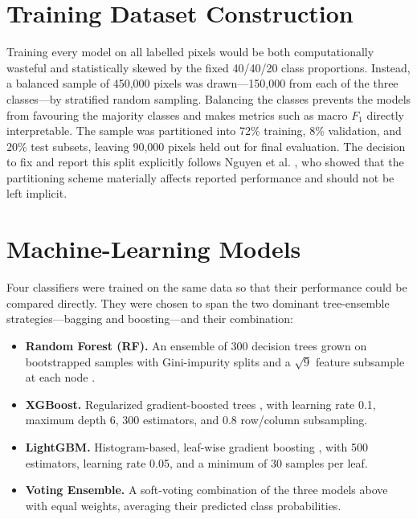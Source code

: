 \section{Training Dataset Construction}
\label{sec:training_data}

Training every model on all \npixels{} labelled pixels would be both
computationally wasteful and statistically skewed by the fixed 40/40/20 class
proportions. Instead, a balanced sample of 450,000 pixels was drawn---150,000
from each of the three classes---by stratified random sampling. Balancing the
classes prevents the models from favouring the majority classes and makes
metrics such as macro $F_1$ directly interpretable. The sample was partitioned
into 72\% training, 8\% validation, and 20\% test subsets, leaving 90,000 pixels
held out for final evaluation. The decision to fix and report this split
explicitly follows Nguyen et al. \cite{nguyen2021datasplitting}, who showed that
the partitioning scheme materially affects reported performance and should not be
left implicit.

\section{Machine-Learning Models}
\label{sec:ml_models}

Four classifiers were trained on the same data so that their performance could be
compared directly. They were chosen to span the two dominant tree-ensemble
strategies---bagging and boosting---and their combination:

\begin{itemize}
  \item \textbf{Random Forest (RF).} An ensemble of 300 decision trees grown on
        bootstrapped samples with Gini-impurity splits and a $\sqrt{9}$ feature
        subsample at each node \cite{liaw2007randomforest,tyralis2019randomforests}.
  \item \textbf{XGBoost.} Regularized gradient-boosted trees
        \cite{chen2016xgboost}, with learning rate 0.1, maximum depth 6, 300
        estimators, and 0.8 row/column subsampling.
  \item \textbf{LightGBM.} Histogram-based, leaf-wise gradient boosting
        \cite{ke2017lightgbm}, with 500 estimators, learning rate 0.05, and a
        minimum of 30 samples per leaf.
  \item \textbf{Voting Ensemble.} A soft-voting combination of the three models
        above with equal weights, averaging their predicted class probabilities.
\end{itemize}

